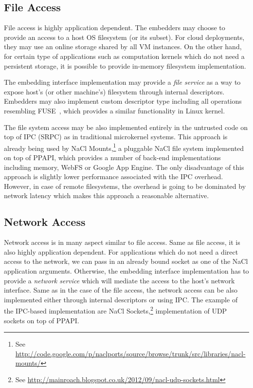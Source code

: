 \subsection{File Access}
\label{sub:file_access}

File access is highly application dependent. The embedders may choose to
provide an access to a host OS filesystem (or its subset).  For cloud
deployments, they may use an online storage shared by all VM instances.
On the other hand, for certain type of applications such as computation
kernels which do not need a persistent storage, it is possible to
provide in-memory filesystem implementation.

The embedding interface implementation may provide a \emph{file service}
as a way to expose host's (or other machine's) filesystem through
internal descriptors. Embedders may also implement custom descriptor
type including all operations resembling
FUSE~\cite{fuse}, which provides a similar functionality in Linux kernel.

The file system access may be also implemented entirely in the untrusted
code on top of IPC (\ie SRPC) as in traditional microkernel systems.
This approach is already being used by
NaCl Mounts,\footnote{See \url{http://code.google.com/p/naclports/source/browse/trunk/src/libraries/nacl-mounts/}}
a pluggable NaCl file system implemented on top of PPAPI, which provides
a number of back-end implementations including memory, WebFS or Google
App Engine. The only disadvantage of this approach is slightly lower
performance associated with the IPC overhead. However, in case of remote
filesystems, the overhead is going to be dominated by network latency
which makes this approach a reasonable alternative.

\subsection{Network Access}
\label{sub:network_access}

Network access is in many aspect similar to file access. Same as file
access, it is also highly application dependent. For applications which
do not need a direct access to the network, we can pass in an already
bound socket as one of the NaCl application arguments. Otherwise, the
embedding interface implementation has to provide a \emph{network
service} which will mediate the access to the host's network interface.
Same as in the case of the file access, the network access can be also
implemented either through internal descriptors or using IPC. The
example of the IPC-based implementation are NaCl
Sockets,\footnote{See \url{http://mainroach.blogspot.co.uk/2012/09/nacl-udp-sockets.html}}
implementation of UDP sockets on top of PPAPI.

